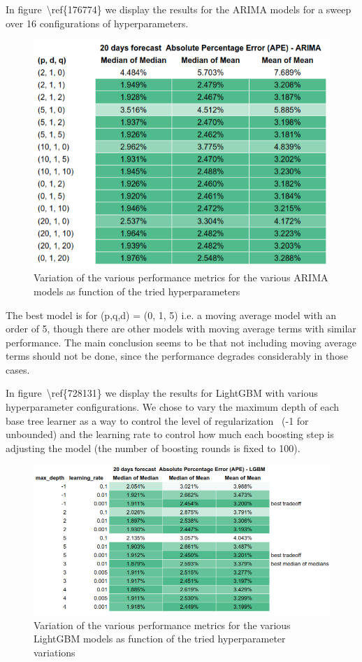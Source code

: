 \documentclass[10pt]{article}
\begin{document}
In figure~{\textbackslash ref\{176774\}} we display the results for the
ARIMA models for a sweep over 16 configurations of hyperparameters.~
\begin{figure}[H]
\begin{center}
\includegraphics[width=0.70\columnwidth]{figures/screenshot4/screenshot}
\caption{{Variation of the various performance metrics for the various ARIMA
models as function of the tried hyperparameters~
{\label{176774}}%
}}
\end{center}
\end{figure}

The best model is for (p,q,d) = (0, 1, 5) i.e. a moving average model
with an order of 5, though there are other models with moving average
terms with similar performance. The main conclusion seems to be that not
including moving average terms should not be done, since the performance
degrades considerably in those cases.~~

In figure~{\textbackslash ref\{728131\}} we display the results for
LightGBM with various hyperparameter configurations. We chose to vary
the maximum depth of each base tree learner as a way to control the
level of regularization~ (-1 for unbounded) and the learning rate to
control how much each boosting step is adjusting the model (the number
of boosting rounds is fixed to 100).~~
\begin{figure}[H]
\begin{center}
\includegraphics[width=0.98\columnwidth]{figures/screenshot61/screenshot61}
\caption{{Variation of the various performance metrics for the various LightGBM
models as function of the tried hyperparameter variations
{\label{728131}}%
}}
\end{center}
\end{figure}
\end{document}
